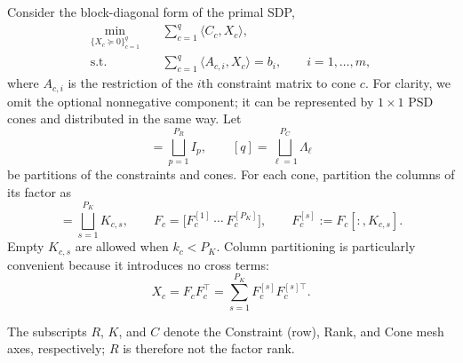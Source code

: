 \documentclass[11pt]{article}
\theoremstyle{definition}
\theoremstyle{remark}
\begin{document}
Consider the block-diagonal form of the primal SDP,
\begin{equation}
\begin{aligned}
    \min_{\{X_c\succeq 0\}_{c=1}^{q}}\quad
    & \sum_{c=1}^{q} \langle C_c,X_c\rangle,\\
    \text{s.t.}\quad
    & \sum_{c=1}^{q}\langle A_{c,i},X_c\rangle=b_i,
      \qquad i=1,\ldots,m,
\end{aligned}
\label{eq:block-sdp-distributed}
\end{equation}
where $A_{c,i}$ is the restriction of the $i$th constraint matrix to
cone $c$.  For clarity, we omit the optional nonnegative component; it can be
represented by $1\times1$ PSD cones and distributed in the same way.  Let
\begin{equation}
    [m]=\bigsqcup_{p=1}^{P_R} I_p,
    \qquad
    [q]=\bigsqcup_{\ell=1}^{P_C}\Lambda_\ell
\label{eq:constraint-cone-partitions}
\end{equation}
be partitions of the constraints and cones.  For each cone, partition the
columns of its factor as
\begin{equation}
    [k_c]=\bigsqcup_{s=1}^{P_K}K_{c,s},
    \qquad
    F_c=\bigl[F_c^{[1]}\ \cdots\ F_c^{[P_K]}\bigr],
    \qquad
    F_c^{[s]}:=F_c[:,K_{c,s}].
\label{eq:rank-partition}
\end{equation}
Empty $K_{c,s}$ are allowed when $k_c<P_K$.  Column partitioning is
particularly convenient because it introduces no cross terms:
\begin{equation}
    X_c=F_cF_c^\top
       =\sum_{s=1}^{P_K}F_c^{[s]}F_c^{[s]\top}.
\label{eq:rank-separable-outer-product}
\end{equation}

The subscripts $R$, $K$, and $C$ denote the Constraint (row), Rank, and Cone
mesh axes, respectively; $R$ is therefore not the factor rank.
\end{document}
